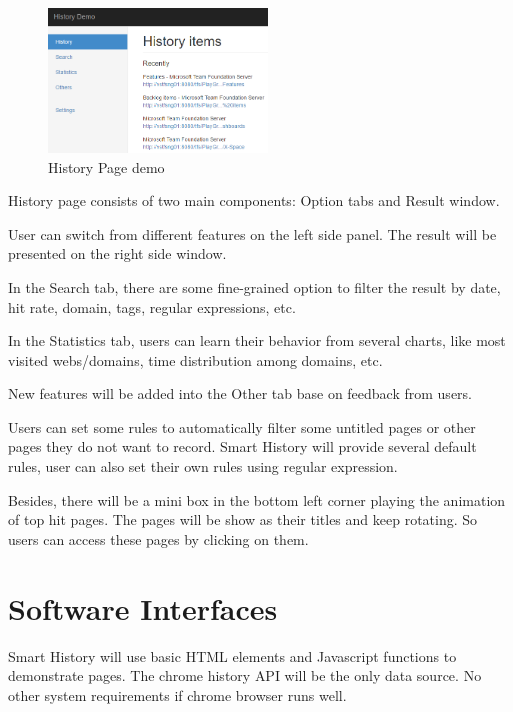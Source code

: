 \documentclass[a5paper]{scrreprt}
\begin{document}
{

\begin{figure}
	\centering
	\includegraphics[width=0.52\textwidth]{spec_history_page}
	\vspace{-20pt}
	\caption{History Page demo}
\end{figure}

History page consists of two main components: Option tabs and Result window.

User can switch from different features on the left side panel. The result will 
be presented on the right side window.

}

In the Search tab, there are some fine-grained option to filter the result by 
date, hit rate, domain, tags, regular expressions, etc.

In the Statistics tab, users can learn their behavior from several charts, like 
most visited webs/domains, time distribution among domains, etc.

New features will be added into the Other tab base on feedback from users.

Users can set some rules to automatically filter some untitled pages or other 
pages they do not want to record. Smart History will provide several default rules, 
user can also set their own rules using regular expression.

Besides, there will be a mini box in the bottom left corner playing the animation 
of top hit pages. The pages will be show as their titles and keep rotating. So 
users can access these pages by clicking on them.


\section{Software Interfaces}

Smart History will use basic HTML elements and Javascript functions to 
demonstrate pages. The chrome history API will be the only data source. No 
other system requirements if chrome browser runs well.
\end{document}
